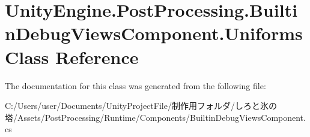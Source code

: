 \hypertarget{class_unity_engine_1_1_post_processing_1_1_builtin_debug_views_component_1_1_uniforms}{}\section{Unity\+Engine.\+Post\+Processing.\+Builtin\+Debug\+Views\+Component.\+Uniforms Class Reference}
\label{class_unity_engine_1_1_post_processing_1_1_builtin_debug_views_component_1_1_uniforms}


The documentation for this class was generated from the following file\+:\begin{DoxyCompactItemize}
\item 
C\+:/\+Users/user/\+Documents/\+Unity\+Project\+File/制作用フォルダ/しろと氷の塔/\+Assets/\+Post\+Processing/\+Runtime/\+Components/Builtin\+Debug\+Views\+Component.\+cs\end{DoxyCompactItemize}
